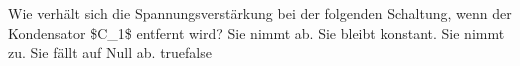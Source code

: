     {Wie verhält sich die Spannungsverstärkung bei der folgenden Schaltung, wenn der Kondensator \$C\_1\$ entfernt wird?}
    {Sie nimmt ab.}
    {Sie bleibt konstant.}
    {Sie nimmt zu.}
    {Sie fällt auf Null ab.}
    {true}{false}